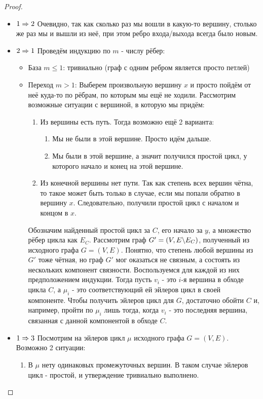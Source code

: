 \begin{proof}~
	\begin{itemize}
		\item $1 \Rightarrow 2$ Очевидно, так как сколько раз мы вошли в какую-то вершину, столько же раз мы и вышли из неё, при этом ребро входа/выхода всегда было новым.
		\item $2 \Rightarrow 1$ Проведём индукцию по $m$ - числу рёбер:
		\begin{itemize}
			\item База $m \le 1$: тривиально (граф с одним ребром является просто петлей)
			
			\item Переход $m > 1$:
			Выберем произвольную вершину $x$ и просто пойдём от неё куда-то по рёбрам, по которым мы ещё не ходили. Рассмотрим возможные ситуации с вершиной, в которую мы придём:
			\begin{enumerate}
				\item Из вершины есть путь. Тогда возможно ещё 2 варианта:
				\begin{enumerate}
					\item Мы не были в этой вершине. Просто идём дальше.
					
					\item Мы были в этой вершине, а значит получился простой цикл, у которого начало и конец на этой вершине.
				\end{enumerate}
			
				\item Из конечной вершины нет пути. Так как степень всех вершин чётна, то такое может быть только в случае, если мы попали обратно в вершину $x$. Следовательно, получили простой цикл с началом и концом в $x$.
			\end{enumerate}
			Обозначим найденный простой цикл за $C$, его начало за $y$, а множество рёбер цикла как $E_C$. Рассмотрим граф $G' = (V, E \backslash E_C)$, полученный из исходного графа $G = (V, E)$. Понятно, что степень любой вершины из $G'$ тоже чётная, но граф $G'$ мог оказаться не связным, а состоять из нескольких компонент связности. Воспользуемся для каждой из них предположением индукции. Тогда пусть $v_i$ - это $i$-я вершина в обходе цикла $C$, а $\mu_i$ - это соответствующий ей эйлеров цикл в своей компоненте. Чтобы получить эйлеров цикл для $G$, достаточно обойти $C$ и, например, пройти по $\mu_i$ лишь тогда, когда $v_i$ - это последняя вершина, связанная с данной компонентой в обходе $C$.
		\end{itemize}
	
		\item $1 \Rightarrow 3$ Посмотрим на эйлеров цикл $\mu$ исходного графа $G = (V, E)$. Возможно 2 ситуации:
		\begin{enumerate}
			\item В $\mu$ нету одинаковых промежуточных вершин. В таком случае эйлеров цикл - простой, и утверждение тривиально выполнено.
			

\end{enumerate}
\end{itemize}
\end{proof}
